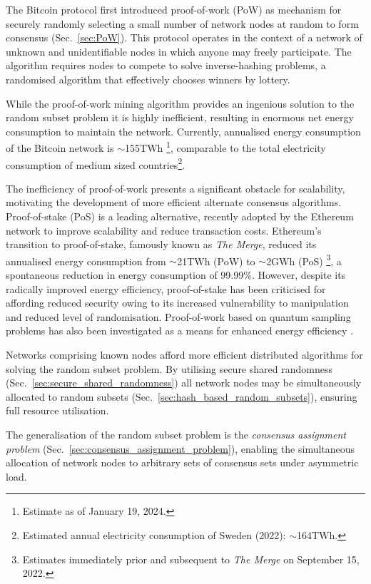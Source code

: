 \documentclass[twocolumn, aps, amsmath, amssymb, nofootinbib, superscriptaddress, longbibliography, floatfix, eqsecnum, rmp]{revtex4-2}
\begin{document}
The Bitcoin protocol \cite{Nakamoto08} first introduced proof-of-work (PoW) as mechanism for securely randomly selecting a small number of network nodes at random to form consensus (Sec.~\ref{sec:PoW}). This protocol operates in the context of a network of unknown and unidentifiable nodes in which anyone may freely participate. The algorithm requires nodes to compete to solve inverse-hashing problems, a randomised algorithm that effectively chooses winners by lottery.

While the proof-of-work mining algorithm provides an ingenious solution to the random subset problem it is highly inefficient, resulting in enormous net energy consumption to maintain the network. Currently, annualised energy consumption of the Bitcoin network is $\sim$155TWh \cite{CBECI}\footnote{Estimate as of January 19, 2024.}, comparable to the total electricity consumption of medium sized countries\footnote{Estimated annual electricity consumption of Sweden (2022): $\sim$164TWh.}.

The inefficiency of proof-of-work presents a significant obstacle for scalability, motivating the development of more efficient alternate consensus algorithms. Proof-of-stake (PoS) \cite{KingNadal, Bentov} is a leading alternative, recently adopted by the Ethereum network to improve scalability and reduce transaction costs. Ethereum's transition to proof-of-stake, famously known as \emph{The Merge}, reduced its annualised energy consumption from $\sim$21TWh (PoW) to $\sim$2GWh (PoS) \cite{CBECI}\footnote{Estimates immediately prior and subsequent to \emph{The Merge} on September 15, 2022.}, a spontaneous reduction in energy consumption of 99.99\%. However, despite its radically improved energy efficiency, proof-of-stake has been criticised for affording reduced security owing to its increased vulnerability to manipulation and reduced level of randomisation. Proof-of-work based on quantum sampling problems has also been investigated as a means for enhanced energy efficiency \cite{QPoW}.

Networks comprising known nodes afford more efficient distributed algorithms for solving the random subset problem. By utilising secure shared randomness (Sec.~\ref{sec:secure_shared_randomness}) all network nodes may be simultaneously allocated to random subsets (Sec.~\ref{sec:hash_based_random_subsets}), ensuring full resource utilisation.

The generalisation of the random subset problem is the \emph{consensus assignment problem} (Sec.~\ref{sec:consensus_assignment_problem}), enabling the simultaneous allocation of network nodes to arbitrary sets of consensus sets under asymmetric load.
\end{document}

